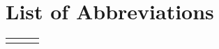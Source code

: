 
\tableofcontents
\cleardoublepage


\newpage
\listoffigures
\cleardoublepage

\chapter*{List of Abbreviations}
\begin{center}
  \begin{tabular}{lll}
    \hspace*{2em} & \hspace*{1in} & \hspace*{4.5in} \\
    
  \end{tabular}
\end{center}
\cleardoublepage


\newpage
\endofprelim
